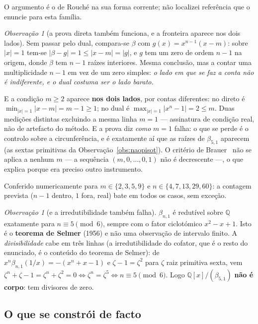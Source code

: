 \documentclass[11pt,a4paper]{article}
\theoremstyle{plain}
\theoremstyle{definition}
\theoremstyle{remark}
\newtheorem{obs}[teorema]{Observação}
\newcommand{\Q}{\mathbb{Q}}
\begin{document}
\noindent O argumento é o de Rouché na sua forma corrente; não localizei referência que o enuncie
para esta família.

\begin{obs}[a prova direta também funciona, e a fronteira aparece nos dois lados]\label{obs:direta}
Sem passar pelo dual, compara-se $\beta$ com $g(x) = x^{n-1}(x-m)$: sobre $|x|=1$ tem-se
$|\beta-g| = 1 \leq |x-m| = |g|$, e $g$ tem um zero de ordem $n-1$ na origem, donde $\beta$ tem
$n-1$ raízes interiores. Mesma conclusão, mas a contar uma multiplicidade $n-1$ em vez de um zero
simples: \emph{o lado em que se faz a conta não é indiferente, e o dual costuma ser o lado barato.}

E a condição $m\geq2$ aparece \textbf{nos dois lados}, por contas diferentes: no direto é
$\min_{|x|=1}|x-m| = m-1 \geq 1$; no dual é $\max_{|x|=1}|x^n-1| = 2 \leq m$. Duas medições
distintas excluindo a mesma linha $m=1$ --- assinatura de condição real, não de artefacto do
método. E a prova diz \emph{como} $m=1$ falha: o que se perde é o controlo sobre a circunferência,
e é exatamente aí que as raízes de $\beta_{5,1}$ aparecem (as sextas primitivas da
Observação~\ref{obs:naopisot}). O critério de Brauer~\cite{brauer1951} não se aplica a nenhum $m$
--- a sequência $(m,0,\dots,0,1)$ não é decrescente ---, o que explica porque era preciso outro
instrumento.
\end{obs}

\medskip
\noindent Conferido numericamente para $m\in\{2,3,5,9\}$ e $n\in\{4,7,13,29,60\}$: a contagem
prevista ($n-1$ dentro, $1$ fora, real) bate em todos os casos, sem exceção.

\begin{obs}[e a irredutibilidade também falha]\label{obs:redutivel}
$\beta_{n,1}$ é redutível sobre $\Q$ exatamente para $n\equiv 5 \pmod 6$, sempre com o fator
ciclotómico $x^2-x+1$. Isto é o \textbf{teorema de Selmer} (1956) e não uma observação de intervalo
finito. A \emph{divisibilidade} cabe em três linhas (a irredutibilidade do cofator, que é o resto
do enunciado, é o conteúdo do teorema de Selmer): de $x^n\beta_{n,1}(1/x) = -(x^n+x-1)$ e
$\zeta-1=\zeta^2$ para
$\zeta$ raiz primitiva sexta, vem $\zeta^n+\zeta-1 = \zeta^n+\zeta^2 = 0 \iff \zeta^n = \zeta^5
\iff n\equiv5\pmod6$. Logo
$\Q[x]/(\beta_{5,1})$ \textbf{não é corpo}: tem divisores de zero.
\end{obs}


\subsection{O que se constrói de facto}
\end{document}
